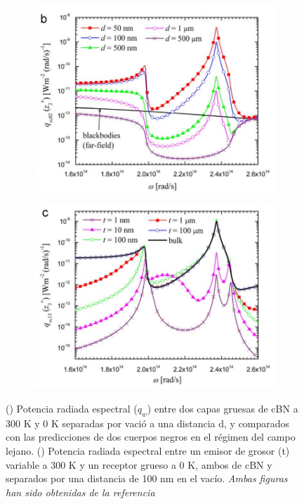 \begin{figure}[H]
\centering
\begin{subfigure}[b]{0.48\textwidth}
	\centering
		\includegraphics[width=\textwidth]{figuras/graficaDiff_dc_fullEqu.png}
		\caption{ 
		}
	\label{fig:graficaDiff_dc_fullEqu}
\end{subfigure}
\begin{subfigure}[b]{0.48\textwidth}
	\centering
		\includegraphics[width=\textwidth]{figuras/graficaDiff_t_fullEqu.png}
		\caption{ 
		}
	\label{fig:graficaDiff_t_fullEqu}
\end{subfigure}
\caption[Potencia radiada espectral por variación de grosor de emisor y variación de distancia]{() Potencia radiada espectral ($q_w$) entre dos capas gruesas de cBN a 300 K y 0 K separadas por vació a una distancia d, y comparados con las predicciones de dos cuerpos negros en el régimen del campo lejano. () Potencia radiada espectral entre un emisor de grosor (t) variable a 300 K y un receptor grueso a 0 K, ambos de cBN y separados por una distancia de 100 nm en el vacío. \textit{Ambas figuras han sido obtenidas de la referencia \cite{nfTPV_fullEquations}}}%
\label{fig:graficas_fullEqu}%
\end{figure}
